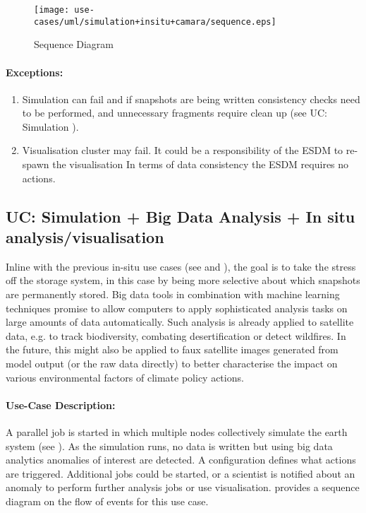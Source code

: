 \begin{figure}
	\centering
	\texttt{[image: use-cases/uml/simulation+insitu+camara/sequence.eps]}
	\caption{Sequence Diagram}
	\label{fig:sequence simulation + in-situ + cam}
\end{figure}



\paragraph{Exceptions:}
\begin{enumerate}
	\item Simulation can fail and if snapshots are being written consistency checks need to be performed, and unnecessary fragments require clean up (see UC: Simulation ).
	\item Visualisation cluster may fail. It could be a responsibility of the ESDM to re-spawn the visualisation In terms of data consistency the ESDM requires no actions.
\end{enumerate}





\subsection{UC: Simulation + Big Data Analysis + In situ analysis/visualisation}
\label{uc: simulation + big data + in-situ}

Inline with the previous in-situ use cases (see  and ), the goal is to take the stress off the storage system, in this case by being more selective about which snapshots are permanently stored.
Big data tools in combination with machine learning techniques promise to allow computers to apply sophisticated analysis tasks on large amounts of data automatically.
Such analysis is already applied to satellite data, e.g. to track biodiversity, combating desertification or detect wildfires.
In the future, this might also be applied to faux satellite images generated from model output (or the raw data directly) to better characterise the impact on various environmental factors of climate policy actions.



\paragraph{Use-Case Description:}
A parallel job is started in which multiple nodes collectively simulate the earth system (see ).
As the simulation runs, no data is written but using big data analytics anomalies of interest are detected.
A configuration defines what actions are triggered.
Additional jobs could be started, or a scientist is notified about an anomaly to perform further analysis jobs or use visualisation.
 provides a sequence diagram on the flow of events for this use case.

